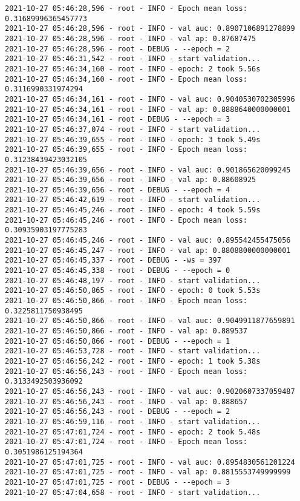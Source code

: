 \documentclass[11pt]{article}
\begin{document}
\begin{verbatim}
2021-10-27 05:46:28,596 - root - INFO - Epoch mean loss: 0.31689996365457773
2021-10-27 05:46:28,596 - root - INFO - val auc: 0.8907106891278899
2021-10-27 05:46:28,596 - root - INFO - val ap: 0.87687475
2021-10-27 05:46:28,596 - root - DEBUG - --epoch = 2
2021-10-27 05:46:31,542 - root - INFO - start validation...
2021-10-27 05:46:34,160 - root - INFO - epoch: 2 took 5.56s
2021-10-27 05:46:34,160 - root - INFO - Epoch mean loss: 0.3116990331974294
2021-10-27 05:46:34,161 - root - INFO - val auc: 0.9040530702305996
2021-10-27 05:46:34,161 - root - INFO - val ap: 0.8888640000000001
2021-10-27 05:46:34,161 - root - DEBUG - --epoch = 3
2021-10-27 05:46:37,074 - root - INFO - start validation...
2021-10-27 05:46:39,655 - root - INFO - epoch: 3 took 5.49s
2021-10-27 05:46:39,655 - root - INFO - Epoch mean loss: 0.31238439423032105
2021-10-27 05:46:39,656 - root - INFO - val auc: 0.901865620099245
2021-10-27 05:46:39,656 - root - INFO - val ap: 0.88608925
2021-10-27 05:46:39,656 - root - DEBUG - --epoch = 4
2021-10-27 05:46:42,619 - root - INFO - start validation...
2021-10-27 05:46:45,246 - root - INFO - epoch: 4 took 5.59s
2021-10-27 05:46:45,246 - root - INFO - Epoch mean loss: 0.30935903197775283
2021-10-27 05:46:45,246 - root - INFO - val auc: 0.895542455475056
2021-10-27 05:46:45,247 - root - INFO - val ap: 0.8808800000000001
2021-10-27 05:46:45,337 - root - DEBUG - -ws = 397
2021-10-27 05:46:45,338 - root - DEBUG - --epoch = 0
2021-10-27 05:46:48,197 - root - INFO - start validation...
2021-10-27 05:46:50,865 - root - INFO - epoch: 0 took 5.53s
2021-10-27 05:46:50,866 - root - INFO - Epoch mean loss: 0.3225811750938495
2021-10-27 05:46:50,866 - root - INFO - val auc: 0.9049911877659891
2021-10-27 05:46:50,866 - root - INFO - val ap: 0.889537
2021-10-27 05:46:50,866 - root - DEBUG - --epoch = 1
2021-10-27 05:46:53,728 - root - INFO - start validation...
2021-10-27 05:46:56,242 - root - INFO - epoch: 1 took 5.38s
2021-10-27 05:46:56,243 - root - INFO - Epoch mean loss: 0.3133492503936092
2021-10-27 05:46:56,243 - root - INFO - val auc: 0.9020607337059487
2021-10-27 05:46:56,243 - root - INFO - val ap: 0.888657
2021-10-27 05:46:56,243 - root - DEBUG - --epoch = 2
2021-10-27 05:46:59,116 - root - INFO - start validation...
2021-10-27 05:47:01,724 - root - INFO - epoch: 2 took 5.48s
2021-10-27 05:47:01,724 - root - INFO - Epoch mean loss: 0.3051986125194364
2021-10-27 05:47:01,725 - root - INFO - val auc: 0.8954830561201224
2021-10-27 05:47:01,725 - root - INFO - val ap: 0.8815553749999999
2021-10-27 05:47:01,725 - root - DEBUG - --epoch = 3
2021-10-27 05:47:04,658 - root - INFO - start validation...

\end{verbatim}
\end{document}
